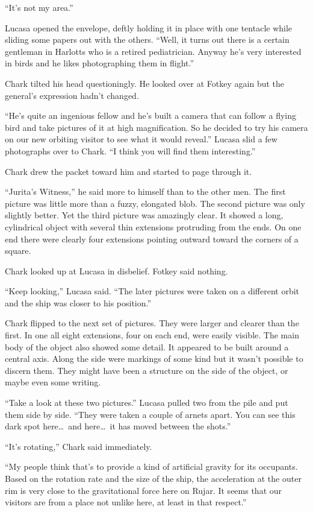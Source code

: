 ``It's not my area.''

Lucasa opened the envelope, deftly holding it in place with one tentacle while sliding some
papers out with the others. ``Well, it turns out there is a certain gentleman in Harlotts who is
a retired pediatrician. Anyway he's very interested in birds and he likes photographing them in
flight.''

Chark tilted his head questioningly. He looked over at Fotkey again but the general's expression
hadn't changed.

``He's quite an ingenious fellow and he's built a camera that can follow a flying bird and take
pictures of it at high magnification. So he decided to try his camera on our new orbiting
visitor to see what it would reveal.'' Lucasa slid a few photographs over to Chark. ``I think
you will find them interesting.''

Chark drew the packet toward him and started to page through it.

``Jurita's Witness,'' he said more to himself than to the other men. The first picture was
little more than a fuzzy, elongated blob. The second picture was only slightly better. Yet the
third picture was amazingly clear. It showed a long, cylindrical object with several thin
extensions protruding from the ends. On one end there were clearly four extensions pointing
outward toward the corners of a square.

Chark looked up at Lucasa in disbelief. Fotkey said nothing.

``Keep looking,'' Lucasa said. ``The later pictures were taken on a different orbit and the ship
was closer to his position.''

Chark flipped to the next set of pictures. They were larger and clearer than the first. In one
all eight extensions, four on each end, were easily visible. The main body of the object also
showed some detail. It appeared to be built around a central axis. Along the side were markings
of some kind but it wasn't possible to discern them. They might have been a structure on the
side of the object, or maybe even some writing.

``Take a look at these two pictures.'' Lucasa pulled two from the pile and put them side by
side. ``They were taken a couple of arnets apart. You can see this dark spot here\ldots\ and
here\ldots\ it has moved between the shots.''

``It's rotating,'' Chark said immediately.

``My people think that's to provide a kind of artificial gravity for its occupants. Based on the
rotation rate and the size of the ship, the acceleration at the outer rim is very close to the
gravitational force here on Rujar. It seems that our visitors are from a place not unlike here,
at least in that respect.''

